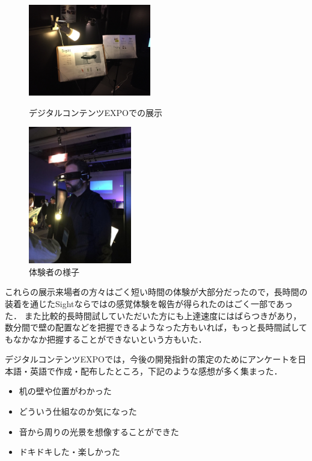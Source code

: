 \begin{figure}[h]

\begin{minipage}{0.49\columnwidth}
\begin{center}
\includegraphics[height=40mm, bb=0 0 1024 768]{images/publicity/DCEXPO1.jpg}
\caption{デジタルコンテンツEXPOでの展示}
\end{center}
\end{minipage}
\begin{minipage}{0.49\columnwidth}
\begin{center}
\includegraphics[height=60mm, bb=0 0 768 1024]{images/publicity/DCEXPO2.jpg}
\caption{体験者の様子}
\end{center}
\end{minipage}

\end{figure}


これらの展示来場者の方々はごく短い時間の体験が大部分だったので，長時間の装着を通じたSightならではの感覚体験を報告が得られたのはごく一部であった．
また比較的長時間試していただいた方にも上達速度にはばらつきがあり，
数分間で壁の配置などを把握できるようなった方もいれば，もっと長時間試してもなかなか把握することができないという方もいた．

デジタルコンテンツEXPOでは，今後の開発指針の策定のためにアンケートを日本語・英語で作成・配布したところ，下記のような感想が多く集まった．

\begin{itemize}
 \item 机の壁や位置がわかった
 \item どういう仕組なのか気になった
 \item 音から周りの光景を想像することができた
 \item ドキドキした・楽しかった
\end{itemize}

